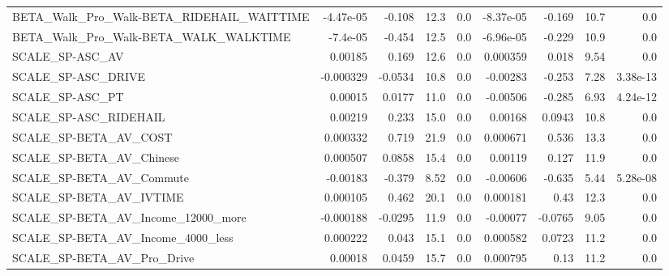 \begin{tabular}{lrrrrrrrr}
BETA\_Walk\_Pro\_Walk-BETA\_RIDEHAIL\_WAITTIME          &   -4.47e-05 &       -0.108 &      12.3 &      0.0 &  -8.37e-05 &      -0.169 &         10.7 &           0.0 \\
BETA\_Walk\_Pro\_Walk-BETA\_WALK\_WALKTIME              &    -7.4e-05 &       -0.454 &      12.5 &      0.0 &  -6.96e-05 &      -0.229 &         10.9 &           0.0 \\
SCALE\_SP-ASC\_AV                                    &     0.00185 &        0.169 &      12.6 &      0.0 &   0.000359 &       0.018 &         9.54 &           0.0 \\
SCALE\_SP-ASC\_DRIVE                                 &   -0.000329 &      -0.0534 &      10.8 &      0.0 &   -0.00283 &      -0.253 &         7.28 &      3.38e-13 \\
SCALE\_SP-ASC\_PT                                    &     0.00015 &       0.0177 &      11.0 &      0.0 &   -0.00506 &      -0.285 &         6.93 &      4.24e-12 \\
SCALE\_SP-ASC\_RIDEHAIL                              &     0.00219 &        0.233 &      15.0 &      0.0 &    0.00168 &      0.0943 &         10.8 &           0.0 \\
SCALE\_SP-BETA\_AV\_COST                              &    0.000332 &        0.719 &      21.9 &      0.0 &   0.000671 &       0.536 &         13.3 &           0.0 \\
SCALE\_SP-BETA\_AV\_Chinese                           &    0.000507 &       0.0858 &      15.4 &      0.0 &    0.00119 &       0.127 &         11.9 &           0.0 \\
SCALE\_SP-BETA\_AV\_Commute                           &    -0.00183 &       -0.379 &      8.52 &      0.0 &   -0.00606 &      -0.635 &         5.44 &      5.28e-08 \\
SCALE\_SP-BETA\_AV\_IVTIME                            &    0.000105 &        0.462 &      20.1 &      0.0 &   0.000181 &        0.43 &         12.3 &           0.0 \\
SCALE\_SP-BETA\_AV\_Income\_12000\_more                 &   -0.000188 &      -0.0295 &      11.9 &      0.0 &   -0.00077 &     -0.0765 &         9.05 &           0.0 \\
SCALE\_SP-BETA\_AV\_Income\_4000\_less                  &    0.000222 &        0.043 &      15.1 &      0.0 &   0.000582 &      0.0723 &         11.2 &           0.0 \\
SCALE\_SP-BETA\_AV\_Pro\_Drive                         &     0.00018 &       0.0459 &      15.7 &      0.0 &   0.000795 &        0.13 &         11.2 &           0.0 \\

\end{tabular}
